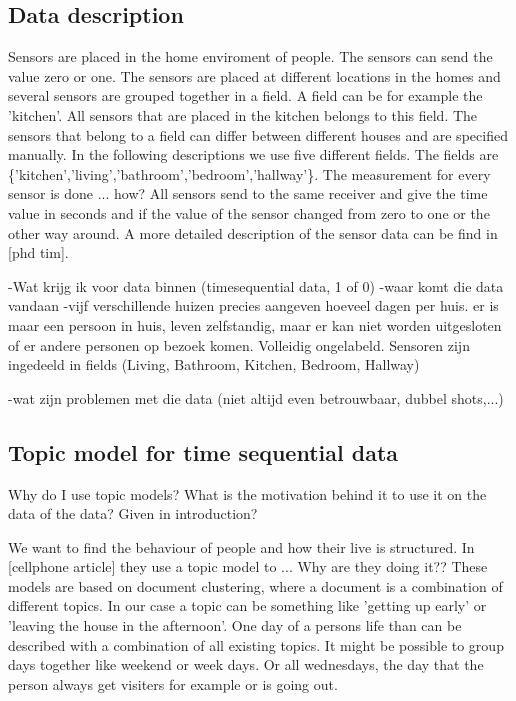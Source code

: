 \documentclass[11pt,a4paper]{report}
\begin{document}
\subsection{Data description}
Sensors are placed in the home enviroment of people. The sensors can send the value zero or one. The sensors are placed at different locations in the homes and several sensors are grouped together in a field. A field can be for example the 'kitchen'. All sensors that are placed in the kitchen belongs to this field. The sensors that belong to a field can differ between different houses and are specified manually. In the following descriptions we use five different fields. The fields are \{'kitchen','living','bathroom','bedroom','hallway'\}.
The measurement for every sensor is done ... how? All sensors send to the same receiver and give the time value in seconds and if the value of the sensor changed from zero to one or the other way around.
A more detailed description of the sensor data can be find in [phd tim].



-Wat krijg ik voor data binnen (timesequential data, 1 of 0)
-waar komt die data vandaan
-vijf verschillende huizen precies aangeven hoeveel dagen per huis. er is maar een persoon in huis, leven zelfstandig, maar er kan niet worden uitgesloten of er andere personen op bezoek komen.
Volleidig ongelabeld.
Sensoren zijn ingedeeld in fields (Living, Bathroom, Kitchen, Bedroom, Hallway)

-wat zijn problemen met die data (niet altijd even betrouwbaar, dubbel shots,...)



\subsection{Topic model for time sequential data}
Why do I use topic models? What is the motivation behind it to use it on the data of the data? Given in introduction?

We want to find the behaviour of people and how their live is structured. In [cellphone article] they use a topic model to ... Why are they doing it??
These models are based on document clustering, where a document is a combination of different topics. In our case a topic can be something like 'getting up early' or 'leaving the house in the afternoon'. One day of a persons life than can be described with a combination of all existing topics. It might be possible to group days together like weekend or week days. Or all wednesdays, the day that the person always get visiters for example or is going out. 
\end{document}
